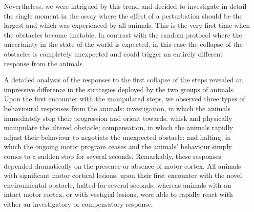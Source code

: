 Nevertheless, we were intrigued by this trend and decided to investigate in detail the single moment in the assay where the effect of a perturbation should be the largest and which was experienced by all animals. This is the very first time when the obstacles become unstable. In contrast with the random protocol where the uncertainty in the state of the world is expected, in this case the collapse of the obstacles is completely unexpected and could trigger an entirely different response from the animals.

A detailed analysis of the responses to the first collapse of the steps revealed an impressive difference in the strategies deployed by the two groups of animals. Upon the first encounter with the manipulated steps, we observed three types of behavioural responses from the animals: investigation, in which the animals immediately stop their progression and orient towards, whisk and physically manipulate the altered obstacle; compensation, in which the animals rapidly adjust their behaviour to negotiate the unexpected obstacle; and halting, in which the ongoing motor program ceases and the animals' behaviour simply comes to a sudden stop for several seconds. Remarkably, these responses depended dramatically on the presence or absence of motor cortex. All animals with significant motor cortical lesions, upon their first encounter with the novel environmental obstacle, halted for several seconds, whereas animals with an intact motor cortex, or with vestigial lesions, were able to rapidly react with either an investigatory or compensatory response.
